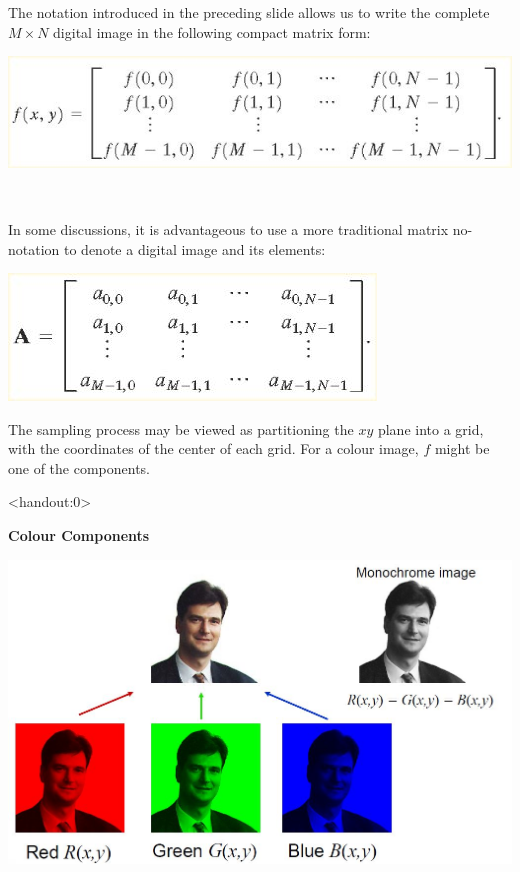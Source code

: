\documentclass{beamer}
\begin{document}
\begin{frame}%
	
	
	
	The notation introduced in the preceding slide allows us to write the 
	complete $M \times N$ digital image in the following compact matrix form: 
	
	\includegraphics[scale = 0.4]{./images/matrix_example.jpg}
	
	\
	
	In some discussions, it is advantageous to use a more traditional matrix no- 
	notation to denote a digital image and its elements: 
	
	\includegraphics[scale = 0.4]{./images/matrix1_example.jpg}
	
	The sampling process may be viewed as partitioning the $xy$ plane into a grid, with the coordinates of the center of each grid. For a colour image, $f$
	might be one of the components.
	
\end{frame}







\begin{frame}<handout:0>
	
	{\textbf{Colour Components}}
	
	
	\includegraphics[scale = 0.3]{./images/colour4_example.jpg}
\end{frame}
\end{document}
